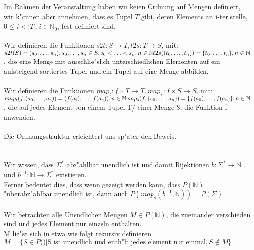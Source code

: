 \documentclass{article}
\newcommand{\gap}{\null\ \\ \\}
\newcommand{\ra}{\rightarrow}
\begin{document}
\subsubsection{}
Im Rahmen der Veranstaltung haben wir keien Ordnung auf Mengen definiert, wir
    k"onnen aber annehmen, dass es Tupel $T$ gibt, deren Elemente an i-ter 
    stelle, $0 \leq i < |T|, i \in \mathbb{N}_0$, fest definiert sind.\\ 
\\
Wir definieren die Funktionen $s2t: S \ra T, t2s: T \ra S$, mit:\\
$\\
s2t(S) = (s_0, \ldots, s_n), s_0
    , \ldots, s_n \in S, s_0 < \ldots < s_n, n \in \mathbb{N}\\
t2s((t_0, \ldots, t_n)) = \{t_0, \ldots, t_n\}
    ,  n \in \mathbb{N}\\
$, die eine Menge mit ausschlie"slich unterschiedlichen Elementen auf ein 
    aufsteigend sortiertes Tupel und ein Tupel auf eine Menge abbilden.\\
\\
Wir definieren die Funktionen 
    $map_t: f \times T \ra T, map_s: f \times S \ra S$, mit:$\\
map_t(f, (a_0, \ldots, a_n)) = (f(a_0), \ldots, f(a_n)), n \in \mathbb{N}\\
map_s(f, \{a_0, \ldots, a_n\}) = \{f(a_0), \ldots, f(a_n)\}, n \in \mathbb{N}\\
$
, die auf jedes Element von einem Tupel T/ einer Menge S, die Funktion f 
    anwenden.\\
\\
Die Ordnungsstruktur erleichtert uns sp"ater den Beweis.\\
\gap
Wir wissen, dass $\Sigma^*$ abz"ahlbar unendlich ist und damit Bijektionen
    $b : \Sigma^* \ra \mathbb{N}$ und $b^{-1} : \mathbb{N} \ra \Sigma^*$ 
    existieren.\\
Ferner bedeutet dies, dass wenn gezeigt werden kann, dass $P(\mathbb{N})$
    "uberabz"ahlbar unendlich ist, dann auch 
    $P(map_s(b^{-1},\mathbb{N})) = P(\Sigma)$\\
\\
Wir betrachten alle Unendlichen Mengen $M \in P(\mathbb{N})$, die zueinander
    verschieden sind und jedes Element nur einzeln enthalten.\\
M lie"se sich in etwa wie folgt rekursiv definieren:\\
$M = \{S \in P(\mathbb) |
    \text{S ist unendlich und enth"lt jedes element nur einmal}, S \not \in M\}$\\
\end{document}
